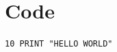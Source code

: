 \documentclass[a4paper,11pt]{report}
\begin{document}
\clearpage
{}
{}



\appendix


\chapter{Code}
\label{app:code}

\begin{verbatim}
10 PRINT "HELLO WORLD"
\end{verbatim}


\end{document}
